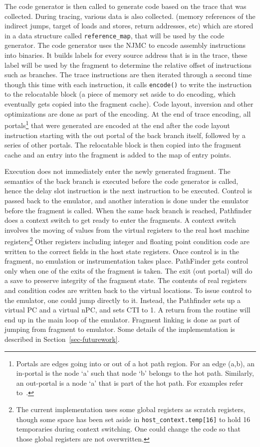 The code generator is then called to generate code based on the trace
that was collected.  
During tracing, various data is also collected. (memory references of the
indirect jumps, target of loads and stores, return addresses, etc) which 
are stored in a data structure called \texttt{reference\_map}, that will 
be used by the code generator.
The code generator uses the NJMC to encode assembly instructions into binaries.
It builds labels for every source address that is in the trace, these label will
be used by the fragment to determine the relative offset of instructions such 
as branches.
The trace instructions are then iterated through a second time though this time 
with each instruction, it calls \texttt{encode()} to write the instruction 
to the relocatable block (a piece of memory set aside to do encoding, which 
eventually gets copied into the fragment cache).
Code layout, inversion and other optimizations are done as part of the encoding.
At the end of trace encoding, all portals\footnote{
Portals are edges going into or out of a hot path region.  
For an edge (a,b), an in-portal is the node `a' such that node `b' belongs
to the hot path.  Similarly, an out-portal is a node `a' that is part of
the hot path.  For examples refer to~\cite{Cifu00g}. 
} that were generated are encoded at the end after the code layout 
instruction starting with the out portal of the back branch itself,  
followed by a series of other portals.
The relocatable block is then copied into the fragment cache and an entry into
the fragment is added to the map of entry points.

Execution does not immediately enter the newly generated fragment. 
The semantics of the back branch is executed before the code generator is
called, hence the delay slot instruction is the next instruction to be executed.
Control is passed back to the emulator, and another interation is done under the
emulator before the fragment is called.
When the same back branch is reached, Pathfinder does a context switch to get
ready to enter the fragments.
A context switch involves the moving of values from the virtual registers to 
the real host machine registers\footnote{
The current implementation uses some global registers as scratch
registers, though some space has been set aside in 
\texttt{host\_context.temp[16]} to hold 16 temporaries during context 
switching.  One could change the code so that those global registers are 
not overwritten.}
Other registers including integer and floating point condition code are written
to the correct fields in the host state registers.
Once control is in the fragment, no emulation or instrumentation takes place.
PathFinder gets control only when one of the exits of the fragment is taken.
The exit (out portal) will do a save to preserve integrity of the fragment
state.  
The contents of real registers and condition codes are written
back to the virtual locations.
To issue control to the emulator, one could jump directly to it.  
Instead, the Pathfinder sets up a virtual PC and a virtual nPC, and sets 
CTI to 1.  
A return from the routine will end up in the main loop of the emulator.
Fragment linking is done as part of jumping from fragment to emulator.  Some
details of the implememtation is described in Section~\ref{sec-futurework}.


